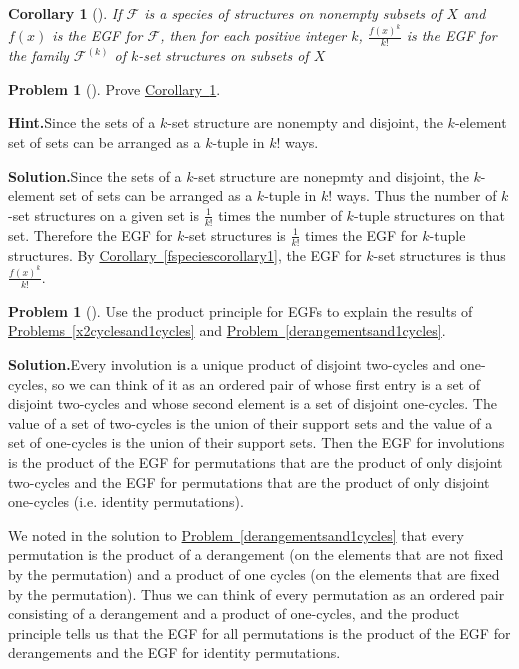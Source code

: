 \documentclass[10pt,]{book}
\theoremstyle{plain}
\newtheorem{corollary}[theorem]{Corollary}
\theoremstyle{definition}
\newtheorem{activity}[project]{Problem}
\theoremstyle{definition}
\numberwithin{equation}{chapter}
\newcommand{\F}{\mathcal{F}}
\begin{document}
\begin{corollary}[{}]\label{fspeciescorollary2}
If \(\F\) is a species of structures on nonempty subsets of \(X\) and \(f(x)\) is the EGF for \(\F\), then for each positive integer \(k\), \(\frac{f(x)^k}{k!}\) is the EGF for the family \(\F^{(k)}\) of \(k\)-set structures on subsets of \(X\)%
\end{corollary}
\begin{activity}[]\label{activity-399}
Prove \hyperref[fspeciescorollary2]{Corollary~\ref{fspeciescorollary2}}.%
\par\medskip\noindent%
\textbf{Hint.}\quad Since the sets of a \(k\)-set structure are nonempty and disjoint, the \(k\)-element set of sets can be arranged as a \(k\)-tuple in \(k!\) ways.%
\par\medskip\noindent%
\textbf{Solution.}\quad Since the sets of a \(k\)-set structure are nonepmty and disjoint, the \(k\)-element set of sets can be arranged as a \(k\)-tuple in \(k!\) ways.  Thus the number of \(k\)-set structures on a given set is \(\frac{1}{k!}\) times the number of \(k\)-tuple structures on that set.  Therefore the EGF for \(k\)-set structures is \(\frac{1}{k!}\) times the EGF for \(k\)-tuple structures.  By \hyperref[fspeciescorollary1]{Corollary~\ref{fspeciescorollary1}}, the EGF for \(k\)-set structures is thus \(\frac{f(x)^k}{k!}\).%
\end{activity}
\begin{activity}[]\label{activity-400}
Use the product principle for EGFs to explain the results of \hyperref[x2cyclesand1cycles]{Problems~\ref{x2cyclesand1cycles}} and \hyperref[derangementsand1cycles]{Problem~\ref{derangementsand1cycles}}.%
\par\medskip\noindent%
\textbf{Solution.}\quad Every involution is a unique product of disjoint two-cycles and one-cycles, so we can think of it as an ordered pair of whose first entry is a set of disjoint two-cycles and whose second element is a set of disjoint one-cycles. The value of a set of two-cycles is the union of their support sets and the value of a set of one-cycles is the union of their support sets. Then the EGF for involutions is the product of the EGF for permutations that are the product of only disjoint two-cycles and the EGF for permutations that are the product of only disjoint one-cycles (i.e. identity permutations).%
\par
We noted in the solution to \hyperref[derangementsand1cycles]{Problem~\ref{derangementsand1cycles}} that every permutation is the product of a derangement (on the elements that are not fixed by the permutation) and a product of one cycles (on the elements that are fixed by the permutation). Thus we can think of every permutation as an ordered pair consisting of a derangement and a product of one-cycles, and the product principle tells us that the EGF for all permutations is the product of the EGF for derangements and the EGF for identity permutations.%
\end{activity}
\end{document}
